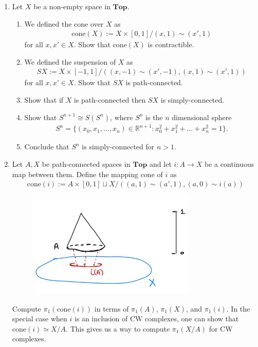\documentclass{article}
\begin{document}
\begin{enumerate}
    \item Let $X$ be a non-empty space in $\mathbf{Top}$.
    \begin{enumerate}
    \item We defined the cone over $X$ as
        \begin{align*}
            \mathrm{cone}(X) := X \times [0,1] / (x,1) \sim (x',1)
        \end{align*}
        for all $x, x' \in X$.
        Show that $\mathrm{cone}(X)$ is contractible.
    \item 
    We defined the suspension of $X$ as 
    \begin{align*}
        SX := X \times [-1,1] / ((x,-1) \sim (x',-1) , (x,1) \sim (x',1))
    \end{align*}
    for all $x,x' \in X$. Show that $SX$ is path-connected.
        \item Show that if $X$ is path-connected then $SX$ is simply-connected.
        \item Show that $S^{n+1} \cong S(S^n)$, where $S^n$ is the $n$ dimensional sphere
        \begin{align*}
            S^n = \{ (x_0, x_1, \dots, x_n) \in \mathbb{R}^{n+1} : x_0^2 + x_1^2 + \dots + x_n^2 = 1\}.
        \end{align*}
        \item Conclude that $S^n$ is simply-connected for $n > 1$.
    \end{enumerate}

    \item 
    Let $A, X$ be path-connected spaces in $\mathbf{Top}$ and let $i: A \to X$ be a continuous map between them.
    Define the mapping cone of $i$ as 
    \begin{align*}
        \mathrm{cone}(i) := A \times [0,1] \sqcup X / ((a,1) \sim (a',1), (a,0) \sim i(a))
    \end{align*}
    \begin{figure}[H]
        \centering          \includegraphics[height=5cm]{images/mapping cone.jpg} 
    \end{figure}
    Compute $\pi_1(\mathrm{cone}(i))$ in terms of $\pi_1(A)$, $\pi_1(X)$, and $\pi_1(i)$.
    In the special case when $i$ is an inclusion of CW complexes, one can show that $\mathrm{cone}(i) \simeq X/A$. This gives us a way to compute $\pi_1(X/A)$ for CW complexes.
    \end{enumerate}
\end{document}
